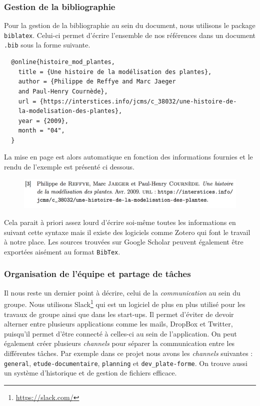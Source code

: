 \subsubsection*{Gestion de la bibliographie}
Pour la gestion de la bibliographie au sein du document,
nous utilisons le package \texttt{biblatex}.
Celui-ci permet d'écrire l'ensemble de nos références dans un document \texttt{.bib}
sous la forme suivante.
\begin{verbatim}
  @online{histoire_mod_plantes,
    title = {Une histoire de la modélisation des plantes},
    author = {Philippe de Reffye and Marc Jaeger 
    and Paul-Henry Cournède},
    url = {https://interstices.info/jcms/c_38032/une-histoire-de-
    la-modelisation-des-plantes},
    year = {2009},
    month = "04",
  }
\end{verbatim}
La mise en page est alors automatique en fonction des informations fournies
et le rendu de l'exemple est présenté ci dessous.
\begin{figure}[h]
    \includegraphics[scale=0.6]{./img/rendu_elem_bib.jpg}
\end{figure}

Cela parait à priori assez lourd d'écrire soi-même toutes les informations
en suivant cette syntaxe mais il existe des logiciels comme Zotero
qui font le travail à notre place.
Les sources trouvées sur Google Scholar peuvent également être exportées
aisément au format \texttt{BibTex}.
           
\subsubsection*{Organisation de l'équipe et partage de tâches}
Il nous reste un dernier point à décrire, celui de la \emph{communication}
au sein du groupe.
Nous utilisons Slack\footnote{\url{https://slack.com/}} qui est un logiciel
de plus en plus utilisé pour les travaux de groupe ainsi que dans les start-ups.
Il permet d'éviter de devoir alterner entre plusieurs applications comme les mails,
DropBox et Twitter, puisqu'il permet d'être connecté
à celles-ci au sein de l'application.
On peut également créer plusieurs \emph{channels} pour séparer la communication
entre les différentes tâches.
Par exemple dans ce projet nous avons les \emph{channels} suivantes :
\texttt{general}, \texttt{etude-documentaire}, 
\texttt{planning} et \texttt{dev\_plate-forme}.
On trouve aussi un système d'historique et de gestion de fichiers efficace.


